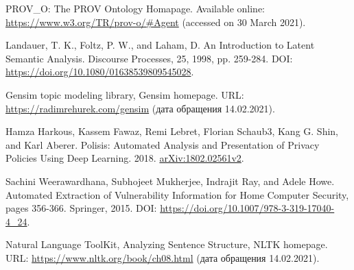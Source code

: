 \documentclass[../main]{subfiles}
\begin{document}
\begin{english}
\begin{biblenum}
     PROV\_O: The PROV Ontology Homapage. Available online: \url{https://www.w3.org/TR/prov-o/#Agent} (accessed on 30 March 2021).

     Landauer, T. K., Foltz, P. W., and Laham, D. An Introduction to Latent Semantic Analysis. Discourse Processes, 25, 1998, pp. 259-284. DOI: \url{https://doi.org/10.1080/01638539809545028}.

     Gensim topic modeling library, Gensim homepage. URL: \url{https://radimrehurek.com/gensim} (дата обращения 14.02.2021).

     Hamza Harkous, Kassem Fawaz, Remi Lebret, Florian Schaub3, Kang G. Shin, and Karl Aberer. Polisis: Automated Analysis and Presentation of Privacy Policies Using Deep Learning. 2018. \href{https://arxiv.org/abs/1802.02561v2}{arXiv:1802.02561v2}.

     Sachini Weerawardhana, Subhojeet Mukherjee, Indrajit Ray, and Adele Howe. Automated Extraction of Vulnerability Information for Home Computer Security, pages 356-366. Springer, 2015. DOI: \url{https://doi.org/10.1007/978-3-319-17040-4_24}.

     Natural Language ToolKit, Analyzing Sentence Structure, NLTK home\-page. URL: \url{https://www.nltk.org/book/ch08.html} (дата обращения 14.02.2021).


    





\end{biblenum}
\end{english}
\end{document}
